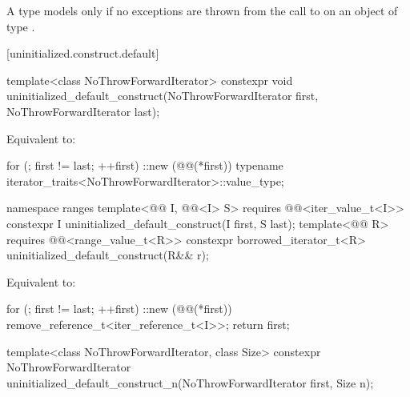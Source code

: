 \begin{itemdescr}
\pnum
A type  models 
only if no exceptions are thrown from the call to 
on an object of type .
\end{itemdescr}

[uninitialized.construct.default]{}

%
\begin{itemdecl}
template<class NoThrowForwardIterator>
  constexpr void uninitialized_default_construct(NoThrowForwardIterator first,
                                                 NoThrowForwardIterator last);
\end{itemdecl}

\begin{itemdescr}
\pnum
\effects
Equivalent to:
\begin{codeblock}
for (; first != last; ++first)
  ::new (@@(*first))
    typename iterator_traits<NoThrowForwardIterator>::value_type;
\end{codeblock}
\end{itemdescr}

%
\begin{itemdecl}
namespace ranges {
  template<@@ I, @@<I> S>
    requires @@<iter_value_t<I>>
    constexpr I uninitialized_default_construct(I first, S last);
  template<@@ R>
    requires @@<range_value_t<R>>
    constexpr borrowed_iterator_t<R> uninitialized_default_construct(R&& r);
}
\end{itemdecl}

\begin{itemdescr}
\pnum
\effects
Equivalent to:
\begin{codeblock}
for (; first != last; ++first)
  ::new (@@(*first)) remove_reference_t<iter_reference_t<I>>;
return first;
\end{codeblock}
\end{itemdescr}

%
\begin{itemdecl}
template<class NoThrowForwardIterator, class Size>
  constexpr NoThrowForwardIterator
    uninitialized_default_construct_n(NoThrowForwardIterator first, Size n);
\end{itemdecl}


